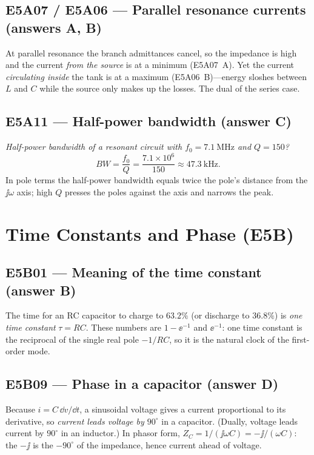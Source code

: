 \subsection*{E5A07 / E5A06 --- Parallel resonance currents (answers A, B)}
At parallel resonance the branch admittances cancel, so the impedance is high and
the current \emph{from the source} is at a minimum (E5A07~A). Yet the current
\emph{circulating inside} the tank is at a maximum (E5A06~B)---energy sloshes
between \(L\) and \(C\) while the source only makes up the losses. The dual of the
series case.

\subsection*{E5A11 --- Half-power bandwidth (answer C)}
\emph{Half-power bandwidth of a resonant circuit with \(f_0=\SI{7.1}{\mega\hertz}\)
and \(Q=150\)?}
\[
BW=\frac{f_0}{Q}=\frac{7.1\times10^6}{150}\approx\SI{47.3}{\kilo\hertz}.
\]
In pole terms the half-power bandwidth equals twice the pole's distance from the
\(\jj\omega\) axis; high \(Q\) presses the poles against the axis and narrows the
peak.

\section{Time Constants and Phase (E5B)}

\subsection*{E5B01 --- Meaning of the time constant (answer B)}
The time for an RC capacitor to charge to \(63.2\%\) (or discharge to \(36.8\%\))
is \emph{one time constant} \(\tau=RC\). These numbers are \(1-\ee^{-1}\) and
\(\ee^{-1}\): one time constant is the reciprocal of the single real pole
\(-1/RC\), so it is the natural clock of the first-order mode.

\subsection*{E5B09 --- Phase in a capacitor (answer D)}
Because \(i=C\,\dd v/\dd t\), a sinusoidal voltage gives a current proportional to
its derivative, so \emph{current leads voltage by \(90^\circ\)} in a capacitor.
(Dually, voltage leads current by \(90^\circ\) in an inductor.) In phasor form,
\(Z_C=1/(\jj\omega C)=-\jj/(\omega C)\): the \(-\jj\) is the \(-90^\circ\) of the
impedance, hence current ahead of voltage.

